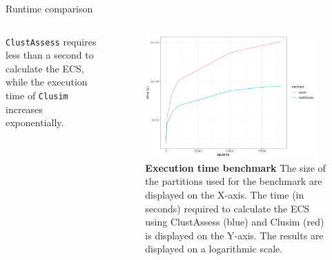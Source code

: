\begin{frame}{Runtime comparison}
    \begin{columns}
        \begin{column}{0.45\textwidth}
            \justifying
           

           \texttt{ClustAssess} requires less than a second to calculate the ECS, while the execution time of \texttt{Clusim} increases exponentially.
        \end{column}

        \begin{column}{0.5\textwidth}
            \begin{figure}
                \includegraphics[width=0.95\textwidth]{images/ch4/4_clusim_ca_time.png}
                
                \caption{\justifying \textbf{Execution time benchmark} The size of the partitions used for the benchmark are displayed on the X-axis. The time (in seconds) required to calculate the ECS using ClustAssess (blue) and Clusim (red) is displayed on the Y-axis. The results are displayed on a logarithmic scale.}

            \end{figure}
        \end{column}
    \end{columns}
\end{frame}

